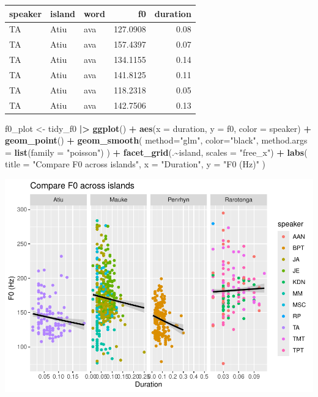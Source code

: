 \documentclass[
  ,man,floatsintext]{apa6}
\newenvironment{Shaded}{\begin{snugshade}}{\end{snugshade}}
\newcommand{\AttributeTok}[1]{\textcolor[rgb]{0.13,0.29,0.53}{#1}}
\newcommand{\FunctionTok}[1]{\textcolor[rgb]{0.13,0.29,0.53}{\textbf{#1}}}
\newcommand{\NormalTok}[1]{#1}
\newcommand{\OtherTok}[1]{\textcolor[rgb]{0.56,0.35,0.01}{#1}}
\newcommand{\SpecialCharTok}[1]{\textcolor[rgb]{0.81,0.36,0.00}{\textbf{#1}}}
\newcommand{\StringTok}[1]{\textcolor[rgb]{0.31,0.60,0.02}{#1}}
\begin{document}
\begin{tabular}{l|l|l|r|r}
\hline
speaker & island & word & f0 & duration\\
\hline
TA & Atiu & ava & 127.0908 & 0.08\\
\hline
TA & Atiu & ava & 157.4397 & 0.07\\
\hline
TA & Atiu & ava & 134.1155 & 0.14\\
\hline
TA & Atiu & ava & 141.8125 & 0.11\\
\hline
TA & Atiu & ava & 118.2318 & 0.05\\
\hline
TA & Atiu & ava & 142.7506 & 0.13\\
\hline
\end{tabular}

\begin{Shaded}
\begin{Highlighting}[]
\NormalTok{f0\_plot }\OtherTok{\textless{}{-}}\NormalTok{ tidy\_f0 }\SpecialCharTok{|\textgreater{}}
  \FunctionTok{ggplot}\NormalTok{() }\SpecialCharTok{+} 
  \FunctionTok{aes}\NormalTok{(}\AttributeTok{x =}\NormalTok{ duration, }\AttributeTok{y =}\NormalTok{ f0, }\AttributeTok{color =}\NormalTok{ speaker) }\SpecialCharTok{+}
  \FunctionTok{geom\_point}\NormalTok{() }\SpecialCharTok{+}
  \FunctionTok{geom\_smooth}\NormalTok{(}
    \AttributeTok{method=}\StringTok{"glm"}\NormalTok{,}
    \AttributeTok{color=}\StringTok{"black"}\NormalTok{,}
    \AttributeTok{method.args =} \FunctionTok{list}\NormalTok{(}\AttributeTok{family =} \StringTok{"poisson"}\NormalTok{)}
\NormalTok{  ) }\SpecialCharTok{+}
  \FunctionTok{facet\_grid}\NormalTok{(.}\SpecialCharTok{\textasciitilde{}}\NormalTok{island,}
             \AttributeTok{scales =} \StringTok{"free\_x"}\NormalTok{) }\SpecialCharTok{+}
  \FunctionTok{labs}\NormalTok{(}
    \AttributeTok{title =} \StringTok{"Compare F0 across islands"}\NormalTok{, }
    \AttributeTok{x =} \StringTok{"Duration"}\NormalTok{, }
    \AttributeTok{y =} \StringTok{"F0 (Hz)"}
\NormalTok{  ) }
\end{Highlighting}
\end{Shaded}

\includegraphics{D2_CIM_files/figure-latex/print-f0-plot-1.pdf}
\end{document}
